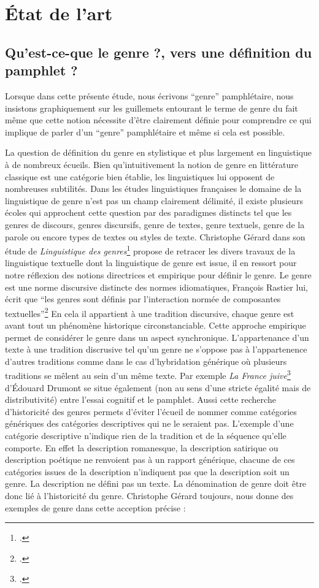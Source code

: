 \chapter{État de l'art}

\section{Qu'est-ce-que le genre ?, vers une définition du pamphlet ?}
Lorsque dans cette présente étude, nous écrivons \enquote{genre} pamphlétaire, nous insistons graphiquement sur les guillemets entourant le terme de genre du fait même que cette notion nécessite d'être clairement définie pour comprendre ce qui implique de parler d'un \enquote{genre} pamphlétaire et même si cela est possible.\par
La question de définition du genre en stylistique et plus largement en linguistique à de nombreux écueils. Bien qu'intuitivement la notion de genre en littérature classique est une catégorie bien établie, les linguistiques lui opposent de nombreuses subtilités. Dans les études linguistiques françaises le domaine de la linguistique de genre n'est pas un champ clairement délimité, il existe plusieurs écoles qui approchent cette question par des paradigmes distincts tel que les genres de discours, genres discursifs, genre de textes, genre textuels, genre de la parole ou encore types de textes ou styles de texte. Christophe Gérard dans son étude de \textit{Linguistique des genres}\footcites{gerard_linguistique_2019} propose de retracer les divers travaux de la linguistique textuelle dont la linguistique de genre est issue, il en ressort pour notre réflexion des notions directrices et empirique pour définir le genre. Le genre est une norme discursive distincte des normes idiomatiques, François Rastier lui, écrit que \enquote{les genres sont définis par l'interaction normée de composantes textuelles}\footcites{rastier_malrieu_nodate} En cela il appartient à une tradition discursive, chaque genre est avant tout un phénomène historique circonstanciable. Cette approche empirique permet de considérer le genre dans un aspect synchronique. L'appartenance d'un texte à une tradition discrusive tel qu'un genre ne s'oppose pas à l'appartenence d'autres traditions comme dans le cas d'hybridation générique où plusieurs traditions se mêlent au sein d'un même texte. Par exemple \textit{La France juive}\footcites{drumont_france_1888} d'Édouard Drumont se situe également (non au sens d'une stricte égalité mais de distributivité) entre l'essai cognitif et le pamphlet. Aussi cette recherche d'historicité des genres permets d'éviter l'écueil de nommer comme catégories génériques des catégories descriptives qui ne le seraient pas. L'exemple d'une catégorie descriptive n'indique rien de la tradition et de la séquence qu'elle comporte. En effet la description romanesque, la description satirique ou description poétique ne renvoient pas à un rapport générique, chacune de ces catégories issues de la description n'indiquent pas que la description soit un genre. La description ne défini pas un texte. La dénomination de genre doit être donc lié à l'historicité du genre. Christophe Gérard toujours, nous donne des exemples de genre dans cette acception précise : 